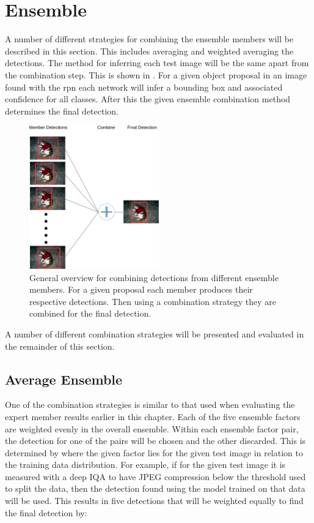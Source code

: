 \section{Ensemble}
A number of different strategies for combining the ensemble members will be described in this section. This includes averaging and weighted averaging the detections. The method for inferring each test image will be the same apart from the combination step. This is shown in . For a given object proposal in an image found with the \gls{rpn} each network will infer a bounding box and associated confidence for all classes. After this the given ensemble combination method determines the final detection. 
\begin{figure}[H]
  \centering
    \includegraphics[width=0.5\textwidth]{Figs/Implementation/ensemble.pdf}
      \caption{General overview for combining detections from different ensemble members. For a given proposal each member produces their respective detections. Then using a combination strategy they are combined for the final detection.}
    \label{fig:ensemble_general}
\end{figure}

A number of different combination strategies will be presented and evaluated in the remainder of this section. 

\subsection{Average Ensemble}
One of the combination strategies is similar to that used when evaluating the expert member results earlier in this chapter. Each of the five ensemble factors are weighted evenly in the overall ensemble. Within each ensemble factor pair, the detection for one of the pairs will be chosen and the other discarded. This is determined by where the given factor lies for the given test image in relation to the training data distribution. For example, if for the given test image it is measured with a deep IQA to have JPEG compression below the threshold used to split the data, then the detection found using the model trained on that data will be used. This results in five detections that will be weighted equally to find the final detection by:

